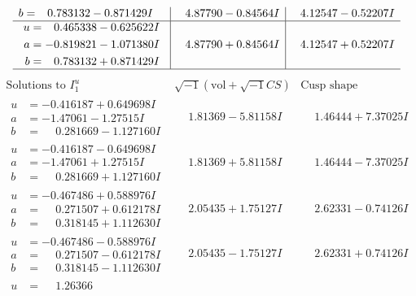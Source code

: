 \documentclass[1p]{elsarticle_modified}
\theoremstyle{definition}
\newcommand{\I}{\sqrt{-1}}
\begin{document}
$$\begin{array}{c|c|c}
\begin{aligned}
b &= \phantom{-}0.783132 - 0.871429 I\end{aligned}
 & \phantom{-}4.87790 - 0.84564 I & \phantom{-}4.12547 - 0.52207 I \\ \hline\begin{aligned}
u &= \phantom{-}0.465338 - 0.625622 I \\
a &= -0.819821 - 1.071380 I \\
b &= \phantom{-}0.783132 + 0.871429 I\end{aligned}
 & \phantom{-}4.87790 + 0.84564 I & \phantom{-}4.12547 + 0.52207 I\\
 \hline 
 \end{array}$$\newpage$$\begin{array}{c|c|c}  
\text{Solutions to }I^u_{1}& \I (\text{vol} + \sqrt{-1}CS) & \text{Cusp shape}\\
 \hline 
\begin{aligned}
u &= -0.416187 + 0.649698 I \\
a &= -1.47061 - 1.27515 I \\
b &= \phantom{-}0.281669 - 1.127160 I\end{aligned}
 & \phantom{-}1.81369 - 5.81158 I & \phantom{-}1.46444 + 7.37025 I \\ \hline\begin{aligned}
u &= -0.416187 - 0.649698 I \\
a &= -1.47061 + 1.27515 I \\
b &= \phantom{-}0.281669 + 1.127160 I\end{aligned}
 & \phantom{-}1.81369 + 5.81158 I & \phantom{-}1.46444 - 7.37025 I \\ \hline\begin{aligned}
u &= -0.467486 + 0.588976 I \\
a &= \phantom{-}0.271507 + 0.612178 I \\
b &= \phantom{-}0.318145 + 1.112630 I\end{aligned}
 & \phantom{-}2.05435 + 1.75127 I & \phantom{-}2.62331 - 0.74126 I \\ \hline\begin{aligned}
u &= -0.467486 - 0.588976 I \\
a &= \phantom{-}0.271507 - 0.612178 I \\
b &= \phantom{-}0.318145 - 1.112630 I\end{aligned}
 & \phantom{-}2.05435 - 1.75127 I & \phantom{-}2.62331 + 0.74126 I \\ \hline\begin{aligned}
u &= \phantom{-}1.26366\phantom{ +0.000000I} \\

\end{aligned}
\end{array}$$
\end{document}
